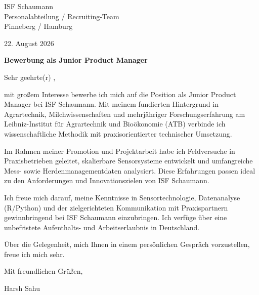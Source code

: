 \documentclass[10pt,a4paper]{article}
\begin{document}

ISF Schaumann\\

Personalabteilung / Recruiting-Team\\

Pinneberg / Hamburg

\vspace{10pt}
22. August 2026

\vspace{10pt}
\textbf{Bewerbung als Junior Product Manager}


\vspace{8pt}
Sehr geehrte(r) ,


mit großem Interesse bewerbe ich mich auf die Position als Junior Product Manager bei ISF Schaumann. Mit meinem fundierten Hintergrund in Agrartechnik, Milchwissenschaften und mehrjähriger Forschungserfahrung am Leibniz-Institut für Agrartechnik und Bioökonomie (ATB) verbinde ich wissenschaftliche Methodik mit praxisorientierter technischer Umsetzung.

\vspace{4pt}

Im Rahmen meiner Promotion und Projektarbeit habe ich Feldversuche in Praxisbetrieben geleitet, skalierbare Sensorsysteme entwickelt und umfangreiche Mess- sowie Herdenmanagementdaten analysiert. Diese Erfahrungen passen ideal zu den Anforderungen und Innovationszielen von ISF Schaumann.

\vspace{4pt}

Ich freue mich darauf, meine Kenntnisse in Sensortechnologie, Datenanalyse (R/Python) und der zielgerichteten Kommunikation mit Praxispartnern gewinnbringend bei ISF Schaumann einzubringen. Ich verfüge über eine unbefristete Aufenthalts- und Arbeitserlaubnis in Deutschland.

\vspace{4pt}

Über die Gelegenheit, mich Ihnen in einem persönlichen Gespräch vorzustellen, freue ich mich sehr.

\vspace{4pt}


Mit freundlichen Grüßen,

\vspace{14pt}
Harsh Sahu
\end{document}
